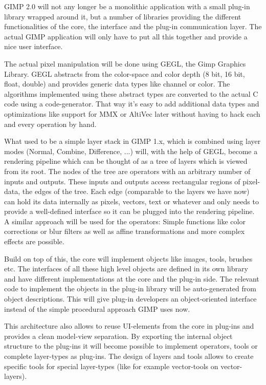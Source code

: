 GIMP 2.0 will not any longer be a monolithic application with a small plug-in library wrapped around it, but a number of libraries providing the different functionalities of the core, the interface and the plug-in communication layer. The actual GIMP application will only have to put all this together and provide a nice user interface. 

The actual pixel manipulation will be done using GEGL, the Gimp Graphics Library. GEGL abstracts from the color-space and color depth (8 bit, 16 bit, float, double) and provides generic data types like channel or color. The algorithms implemented using these abstract types are converted to the actual C code using a code-generator. That way it's easy to add additional data types and optimizations like support for MMX or AltiVec later without having to hack each and every operation by hand. 

What used to be a simple layer stack in GIMP 1.x, which is combined using layer modes (Normal, Combine, Difference, ...) will, with the help of GEGL, become a rendering pipeline which can be thought of as a tree of layers which is viewed from its root. The nodes of the tree are operators with an arbitrary number of inputs and outputs. These inputs and outputs access rectangular regions of pixel-data, the edges of the tree. Each edge (comparable to the layers we have now) can hold its data internally as pixels, vectors, text or whatever and only needs to provide a well-defined interface so it can be plugged into the rendering pipeline. A similar approach will be used for the operators: Simple functions like color corrections or blur filters as well as affine transformations and more complex effects are possible. 

 
Build on top of this, the core will implement objects like images, tools, brushes etc. The interfaces of all these high level objects are defined in its own library and have different implementations at the core and the plug-in side. The relevant code to implement the objects in the plug-in library will be auto-generated from object descriptions. This will give plug-in developers an object-oriented interface instead of the simple procedural approach GIMP uses now. 


This architecture also allows to reuse UI-elements from the core in plug-ins and provides a clean model-view separation. By exporting the internal object structure to the plug-ins it will become possible to implement operators, tools or complete layer-types as plug-ins. The design of layers and tools allows to create specific tools for special layer-types (like for example vector-tools on vector-layers). 


